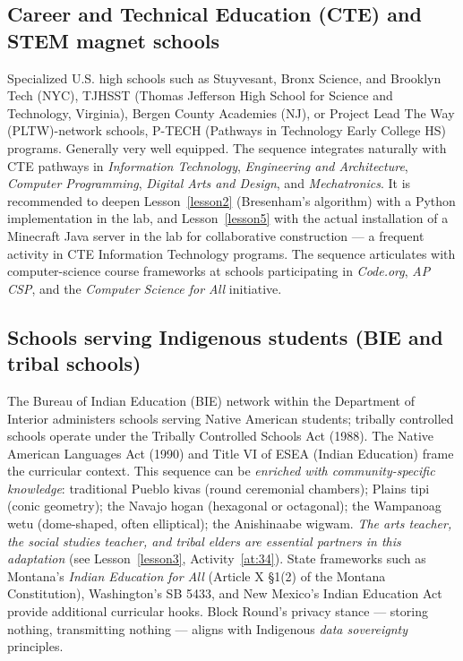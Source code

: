 \documentclass[12pt,a4paper]{scrartcl}
\begin{document}
\subsection{Career and Technical Education (CTE) and STEM magnet schools}
Specialized U.S. high schools such as Stuyvesant, Bronx Science, and Brooklyn Tech (NYC), TJHSST (Thomas Jefferson High School for Science and Technology, Virginia), Bergen County Academies (NJ), or Project Lead The Way (PLTW)-network schools, P-TECH (Pathways in Technology Early College HS) programs. Generally very well equipped. The sequence integrates naturally with CTE pathways in \emph{Information Technology}, \emph{Engineering and Architecture}, \emph{Computer Programming}, \emph{Digital Arts and Design}, and \emph{Mechatronics}. It is recommended to deepen Lesson~\ref{lesson2} (Bresenham's algorithm) with a Python implementation in the lab, and Lesson~\ref{lesson5} with the actual installation of a Minecraft Java server in the lab for collaborative construction --- a frequent activity in CTE Information Technology programs. The sequence articulates with computer-science course frameworks at schools participating in \emph{Code.org}, \emph{AP CSP}, and the \emph{Computer Science for All} initiative.

\subsection{Schools serving Indigenous students (BIE and tribal schools)}
The Bureau of Indian Education (BIE) network within the Department of Interior administers schools serving Native American students; tribally controlled schools operate under the Tribally Controlled Schools Act (1988). The Native American Languages Act (1990) and Title VI of ESEA (Indian Education) frame the curricular context. This sequence can be \emph{enriched with community-specific knowledge}: traditional Pueblo kivas (round ceremonial chambers); Plains tipi (conic geometry); the Navajo hogan (hexagonal or octagonal); the Wampanoag wetu (dome-shaped, often elliptical); the Anishinaabe wigwam. \emph{The arts teacher, the social studies teacher, and tribal elders are essential partners in this adaptation} (see Lesson~\ref{lesson3}, Activity~\ref{at:34}). State frameworks such as Montana's \emph{Indian Education for All} (Article X §1(2) of the Montana Constitution), Washington's SB 5433, and New Mexico's Indian Education Act provide additional curricular hooks. Block Round's privacy stance --- storing nothing, transmitting nothing --- aligns with Indigenous \emph{data sovereignty} principles.
\end{document}
